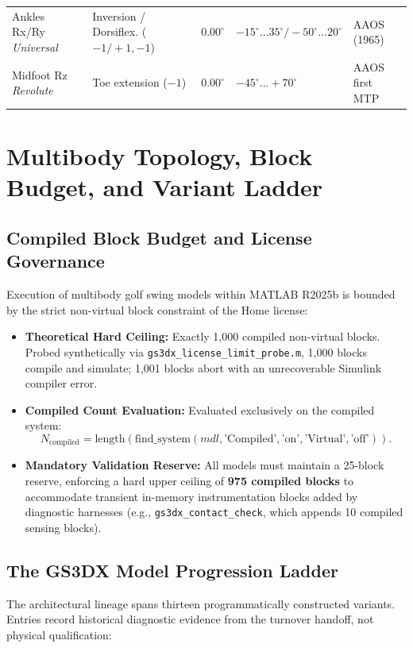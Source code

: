 \documentclass[11pt,a4paper]{article}
\begin{document}
\begin{table}[!htb]
\begin{tabularx}{\textwidth}{p{2.6cm} >{\raggedright\arraybackslash}X c p{3.4cm} >{\raggedright\arraybackslash}X}
\addlinespace[2pt]
Ankles Rx/Ry \newline \textit{Universal} & Inversion / Dorsiflex. ($-1/+1, -1$) & $0.00^\circ$ & $-15^\circ \dots 35^\circ / -50^\circ \dots 20^\circ$ & AAOS (1965) \\
\addlinespace[2pt]
Midfoot Rz \newline \textit{Revolute} & Toe extension ($-1$) & $0.00^\circ$ & $-45^\circ \dots +70^\circ$ & AAOS first MTP \\
\bottomrule
\end{tabularx}
\end{table}

\section{Multibody Topology, Block Budget, and Variant Ladder}

\subsection{Compiled Block Budget and License Governance}
Execution of multibody golf swing models within MATLAB R2025b is bounded by the strict non-virtual block constraint of the Home license:
\begin{itemize}
    \item \textbf{Theoretical Hard Ceiling:} Exactly 1,000 compiled non-virtual blocks. Probed synthetically via \texttt{gs3dx\_license\_limit\_probe.m}, 1,000 blocks compile and simulate; 1,001 blocks abort with an unrecoverable Simulink compiler error.
    \item \textbf{Compiled Count Evaluation:} Evaluated exclusively on the compiled system:
    \begin{equation}
        N_{\text{compiled}} = \text{length}\left(\text{find\_system}(mdl, \text{'Compiled'}, \text{'on'}, \text{'Virtual'}, \text{'off'})\right).
    \end{equation}
    \item \textbf{Mandatory Validation Reserve:} All models must maintain a 25-block reserve, enforcing a hard upper ceiling of \textbf{975 compiled blocks} to accommodate transient in-memory instrumentation blocks added by diagnostic harnesses (e.g., \texttt{gs3dx\_contact\_check}, which appends 10 compiled sensing blocks).
\end{itemize}

\subsection{The GS3DX Model Progression Ladder}
The architectural lineage spans thirteen programmatically constructed variants. Entries record historical diagnostic evidence from the turnover handoff, not physical qualification:
\end{document}
